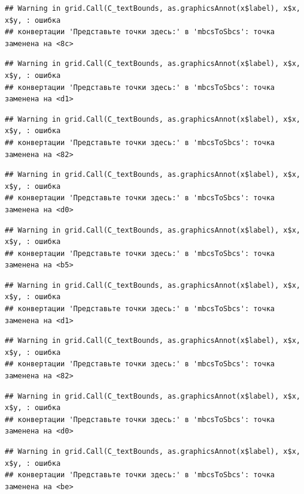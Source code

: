 \documentclass[]{book}
\begin{document}
\begin{verbatim}
## Warning in grid.Call(C_textBounds, as.graphicsAnnot(x$label), x$x, x$y, : ошибка
## конвертации 'Представьте точки здесь:' в 'mbcsToSbcs': точка заменена на <8c>
\end{verbatim}

\begin{verbatim}
## Warning in grid.Call(C_textBounds, as.graphicsAnnot(x$label), x$x, x$y, : ошибка
## конвертации 'Представьте точки здесь:' в 'mbcsToSbcs': точка заменена на <d1>
\end{verbatim}

\begin{verbatim}
## Warning in grid.Call(C_textBounds, as.graphicsAnnot(x$label), x$x, x$y, : ошибка
## конвертации 'Представьте точки здесь:' в 'mbcsToSbcs': точка заменена на <82>
\end{verbatim}

\begin{verbatim}
## Warning in grid.Call(C_textBounds, as.graphicsAnnot(x$label), x$x, x$y, : ошибка
## конвертации 'Представьте точки здесь:' в 'mbcsToSbcs': точка заменена на <d0>
\end{verbatim}

\begin{verbatim}
## Warning in grid.Call(C_textBounds, as.graphicsAnnot(x$label), x$x, x$y, : ошибка
## конвертации 'Представьте точки здесь:' в 'mbcsToSbcs': точка заменена на <b5>
\end{verbatim}

\begin{verbatim}
## Warning in grid.Call(C_textBounds, as.graphicsAnnot(x$label), x$x, x$y, : ошибка
## конвертации 'Представьте точки здесь:' в 'mbcsToSbcs': точка заменена на <d1>
\end{verbatim}

\begin{verbatim}
## Warning in grid.Call(C_textBounds, as.graphicsAnnot(x$label), x$x, x$y, : ошибка
## конвертации 'Представьте точки здесь:' в 'mbcsToSbcs': точка заменена на <82>
\end{verbatim}

\begin{verbatim}
## Warning in grid.Call(C_textBounds, as.graphicsAnnot(x$label), x$x, x$y, : ошибка
## конвертации 'Представьте точки здесь:' в 'mbcsToSbcs': точка заменена на <d0>
\end{verbatim}

\begin{verbatim}
## Warning in grid.Call(C_textBounds, as.graphicsAnnot(x$label), x$x, x$y, : ошибка
## конвертации 'Представьте точки здесь:' в 'mbcsToSbcs': точка заменена на <be>
\end{verbatim}
\end{document}
